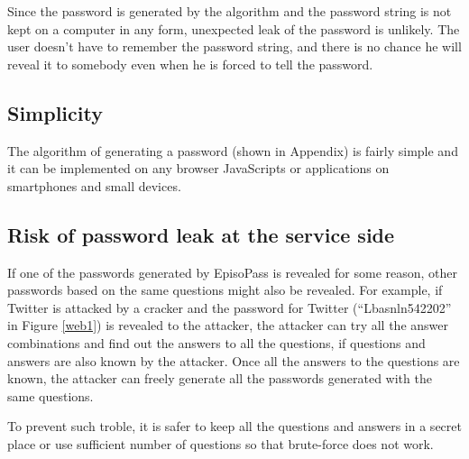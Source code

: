 \documentclass{sigchi}
\begin{document}
Since the password is generated by the algorithm and the password
string is not kept on a computer in any form,
unexpected leak of the password is unlikely.
The user doesn't have to remember the password string, and
there is no chance he will reveal it to somebody
even when he is forced to tell the password.


\subsection{Simplicity}

The algorithm of generating a password (shown in Appendix)
is fairly simple and
it can be implemented on any browser JavaScripts or
applications on smartphones and small devices.

\subsection{Risk of password leak at the service side}

If one of the passwords generated by EpisoPass is revealed
for some reason, other passwords based on the same questions
might also be revealed.
%
For example, if Twitter is attacked by a cracker and
the password for Twitter (``\textsf{Lbasnln542202}'' in Figure \ref{web1})
is revealed to the attacker,
the attacker can try all the answer combinations and find out
the answers to all the questions,
if questions and answers are also known by the attacker.
Once all the answers to the questions are known,
the attacker can freely generate all the passwords
generated with the same questions.

To prevent such troble, it is safer to keep all the questions and answers
in a secret place or
use sufficient number of questions so that brute-force does not work.

% 
%
\end{document}
